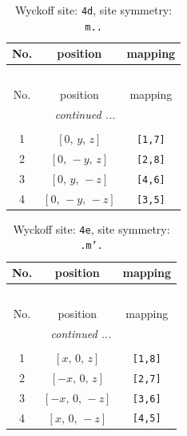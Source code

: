 \documentclass[fleqn,8pt]{jsarticle}
\begin{document}
\begin{longtable}{ccc}
\caption{Wyckoff site: {\tt 4d}, site symmetry: {\tt m..}}
 \\
 \hline \hline
No. & position & mapping \\ \hline \endfirsthead

\multicolumn{2}{l}{\tablename\ \thetable{}} \\
 \hline \hline
No. & position & mapping \\ \hline \endhead

 \hline \hline
\multicolumn{2}{r}{\footnotesize\it continued ...} \\ \endfoot

 \hline \hline
\multicolumn{2}{r}{} \\ \endlastfoot

1 & $\left[ 0,\, y,\, z \right]$ & {\tt [1,7]} \\ \hline
2 & $\left[ 0,\, - y,\, z \right]$ & {\tt [2,8]} \\ \hline
3 & $\left[ 0,\, y,\, - z \right]$ & {\tt [4,6]} \\ \hline
4 & $\left[ 0,\, - y,\, - z \right]$ & {\tt [3,5]} \\
\end{longtable}
\renewcommand{\arraystretch}{1.2}
\begin{longtable}{ccc}
\caption{Wyckoff site: {\tt 4e}, site symmetry: {\tt .m'.}}
 \\
 \hline \hline
No. & position & mapping \\ \hline \endfirsthead

\multicolumn{2}{l}{\tablename\ \thetable{}} \\
 \hline \hline
No. & position & mapping \\ \hline \endhead

 \hline \hline
\multicolumn{2}{r}{\footnotesize\it continued ...} \\ \endfoot

 \hline \hline
\multicolumn{2}{r}{} \\ \endlastfoot

1 & $\left[ x,\, 0,\, z \right]$ & {\tt [1,8]} \\ \hline
2 & $\left[ - x,\, 0,\, z \right]$ & {\tt [2,7]} \\ \hline
3 & $\left[ - x,\, 0,\, - z \right]$ & {\tt [3,6]} \\ \hline
4 & $\left[ x,\, 0,\, - z \right]$ & {\tt [4,5]} \\
\end{longtable}
\renewcommand{\arraystretch}{1.2}
\end{document}
